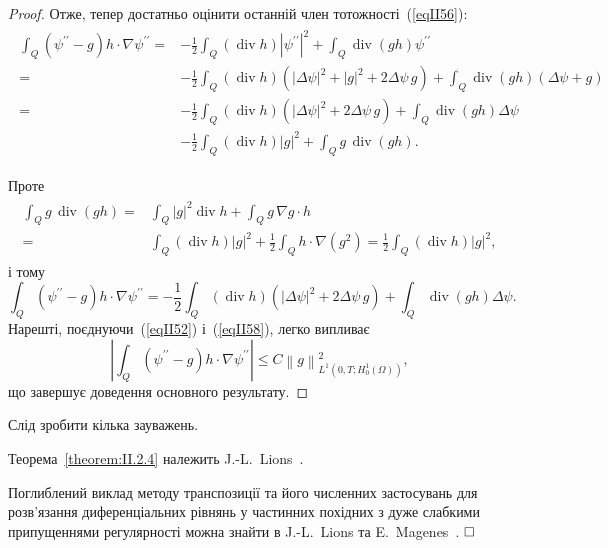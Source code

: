 \begin{proof}
Отже, тепер достатньо оцінити останній член тотожності~(\ref{eqII56}):
\begin{align}\label{eqII57}
\begin{split}
\int_Q (\psi^{\prime\prime} - g) h \cdot \nabla \psi^{\prime\prime} =& -\frac{1}{2} \int_Q (\operatorname{div} h) |\psi^{\prime\prime}|^2 + \int_Q \operatorname{div}(g h) \psi^{\prime\prime}
\\ =& -\frac{1}{2} \int_Q (\operatorname{div} h) (|\Delta \psi|^2 + |g|^2 + 2\Delta \psi\, g) + \int_Q \operatorname{div}(g h)(\Delta \psi + g)
\\ =& -\frac{1}{2} \int_Q (\operatorname{div} h) (|\Delta \psi|^2 + 2\Delta \psi\, g) + \int_Q \operatorname{div}(g h)\Delta \psi
\\ & -\frac{1}{2} \int_Q (\operatorname{div} h) |g|^2 + \int_Q g\, \operatorname{div}(g h).
\end{split}
\end{align}

Проте
\begin{align*}
\begin{split}
\int_Q g\, \operatorname{div}(g h) = &\int_Q |g|^2 \operatorname{div} h + \int_Q g\, \nabla g \cdot h
\\ =& \int_Q (\operatorname{div} h) |g|^2 +  \frac{1}{2} \int_Q h \cdot \nabla (g^2) = \frac{1}{2} \int_Q (\operatorname{div} h) |g|^2,
\end{split}
\end{align*}
і тому
\begin{equation}\label{eqII58}
\int_Q (\psi^{\prime\prime} -g) h \cdot \nabla\psi^{\prime\prime} = -\frac{1}{2} \int_Q (\operatorname{div} h) (|\Delta \psi|^2 + 2\Delta \psi\, g) + \int_Q \operatorname{div}(g h)\Delta \psi.
\end{equation}
Нарешті, поєднуючи~(\ref{eqII52}) і~(\ref{eqII58}), легко випливає
\begin{equation*}
\left| \int_Q (\psi^{\prime\prime} -g) h \cdot \nabla\psi^{\prime\prime} \right| \leq C \left\|g\right\|^2_{L^1(0, T; H_0^1(\Omega))},
\end{equation*}
що завершує доведення основного результату.
\end{proof}
Слід зробити кілька зауважень.
\label{remark:II.2.9}
\begin{remark}
Теорема~\ref{theorem:II.2.4} належить J.-L.~Lions~\cite{lions1988controlabilite}.

Поглиблений виклад методу транспозиції та його численних застосувань для розв'язання диференціальних рівнянь у частинних похідних з дуже слабкими припущеннями регулярності можна знайти в J.-L.~Lions та E.~Magenes~\cite{lions1968problemes}.
$\hfill \square$
\end{remark}

